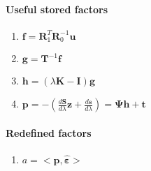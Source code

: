 \documentclass[11pt,twoside]{report}
\begin{document}
\paragraph{Useful stored factors}
\begin{enumerate}
	\item $ \mathbf{f} = \textbf{R}_1^T\textbf{R}_0^{-1}\textbf{u} $
	\item $ \mathbf{g} = \textbf{T}^{-1}\textbf{f} $
	\item $ \mathbf{h} = (\lambda\mathbf{K}-\mathbf{I})\mathbf{g} $
	\item $ \mathbf{p} = -(\frac{d\mathbold{S}}{d\lambda}\mathbold{z} + \frac{d\mathbold{s}}{d\lambda}) =  \boldsymbol{\Psi}\mathbf{h}  +\mathbf{t} $
\end{enumerate}

\paragraph{Redefined factors}
\begin{enumerate}
	\item $ a = <\mathbf{p}, \hat{\mathbold{\varepsilon}}> $
\end{enumerate}

\newpage
\end{document}
